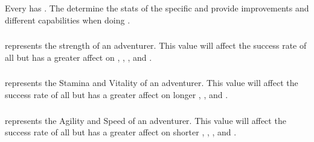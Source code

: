 \chapter{}


\section{}

Every  has . The  determine the stats of the specific  and provide improvements and different capabilities when doing .

\subsection{}

 represents the strength of an adventurer. This value will affect the success rate of all  but has a greater affect on , , , and .

\subsection{}

 represents the Stamina and Vitality of an adventurer. This value will affect the success rate of all  but has a greater affect on longer , ,  and .

\subsection{}

 represents the Agility and Speed of an adventurer. This value will affect the success rate of all  but has a greater affect on shorter , , , and .

\subsection{}

